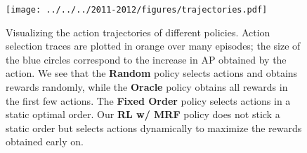 \begin{figure}[h!]
\centering
\texttt{[image: ../../../2011-2012/figures/trajectories.pdf]}
\caption[
Visualizing action trajectories of different object detection policies.]{
Visualizing the action trajectories of different policies.
Action selection traces are plotted in orange over many episodes; the size of the blue circles correspond to the increase in AP obtained by the action.
We see that the \textbf{Random} policy selects actions and obtains rewards randomly, while the \textbf{Oracle} policy obtains all rewards in the first few actions.
The \textbf{Fixed Order} policy selects actions in a static optimal order.
Our \textbf{RL w/ MRF} policy does not stick a static order but selects actions dynamically to maximize the rewards obtained early on.
}
\label{fig:trajectories}
\end{figure}
